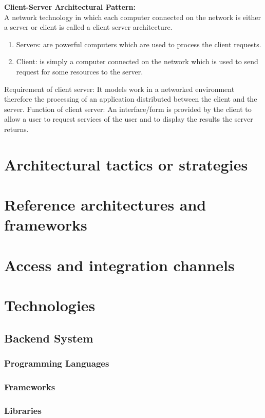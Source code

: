 \documentclass[a4paper,10pt]{article}
\begin{document}
\item \textbf{Client-Server Architectural Pattern:}\\
		A network technology in which each computer connected on the network is either a server or client is called a client server architecture.
		\begin{enumerate}
			\item Servers: are powerful computers which are used to process the client requests.
			\item Client: is simply a computer connected on the network which is used to send request for some resources to the server.
		\end{enumerate}
		Requirement of client server: It models work in a networked environment therefore the processing of an application distributed between the client and the server.
		Function of client server: An interface/form is provided by the client to allow a user to request services of the user and to display the results the server returns.

\section{Architectural tactics or strategies}
 
\section{Reference architectures and frameworks}
 
\section{Access and integration channels}

\section{Technologies}
\subsection{Backend System}
\subsubsection{Programming Languages}
\subsubsection{Frameworks}
\subsubsection{Libraries}
\end{document}
